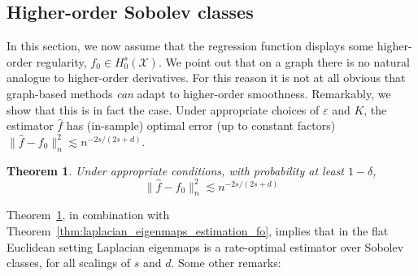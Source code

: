 \documentclass{article}
\newcommand{\1}{\mathbf{1}}
\newcommand{\mc}[1]{\mathcal{#1}}
\newcommand{\wh}[1]{\widehat{#1}}
\theoremstyle{alden}
\theoremstyle{aldenthm}
\newtheorem{theorem}{Theorem}
\theoremstyle{definition}
\theoremstyle{remark}
\begin{document}
\subsection{Higher-order Sobolev classes}
\label{sec:higher_order_sobolev_classes}
In this section, we now assume that the regression function displays some higher-order regularity, $f_0 \in H_0^s(\mc{X})$. We point out that on a graph there is no natural analogue to higher-order derivatives. For this reason it is not at all obvious that graph-based methods \emph{can} adapt to higher-order smoothness. Remarkably, we show that this is in fact the case. Under appropriate choices of $\varepsilon$ and $K$, the estimator $\wh{f}$ has (in-sample) optimal error (up to constant factors) $\|\wh{f} - f_0\|_n^2 \lesssim n^{-2s/(2s + d)}$. 
\begin{theorem}
	\label{thm:laplacian_eigenmaps_estimation_ho}
	Under appropriate conditions, with probability at least $1 - \delta$,
	\begin{equation}
	\label{eqn:laplacian_eigenmaps_estimation_ho}
	\|\wh{f} - f_0\|_n^2 \lesssim n^{-2s/(2s + d)}
	\end{equation}
\end{theorem}
Theorem~\ref{thm:laplacian_eigenmaps_estimation_ho}, in combination with Theorem~\ref{thm:laplacian_eigenmaps_estimation_fo}, implies that in the flat Euclidean setting Laplacian eigenmaps is a rate-optimal estimator over Sobolev classes, for all scalings of $s$ and $d$. Some other remarks:
\end{document}
